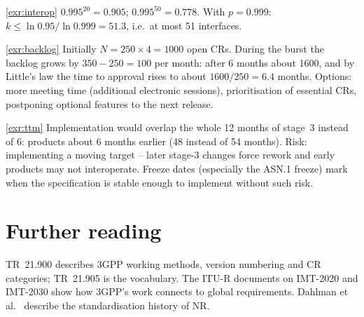 \documentclass[11pt,a4paper]{article}
\begin{document}
\begin{solutionbox}{\ref{exr:interop}}
$0.995^{20} = 0.905$; $0.995^{50} = 0.778$. With $p = 0.999$: $k \le \ln 0.95/\ln 0.999 = 51.3$, i.e.\ at most 51 interfaces.
\end{solutionbox}

\begin{solutionbox}{\ref{exr:backlog}}
Initially $N = 250\times4 = 1000$ open CRs. During the burst the backlog grows by $350 - 250 = 100$ per month: after 6 months
about 1600, and by Little's law the time to approval rises to about $1600/250 = 6.4$ months. Options: more meeting time
(additional electronic sessions), prioritisation of essential CRs, postponing optional features to the next release.
\end{solutionbox}

\begin{solutionbox}{\ref{exr:ttm}}
Implementation would overlap the whole 12 months of stage~3 instead of 6: products about 6 months earlier (48 instead of 54
months). Risk: implementing a moving target -- later stage-3 changes force rework and early products may not interoperate.
Freeze dates (especially the ASN.1 freeze) mark when the specification is stable enough to implement without such risk.
\end{solutionbox}

\section{Further reading}
TR~21.900 \cite{tr21900} describes 3GPP working methods, version numbering and CR categories; TR~21.905 \cite{tr21905} is the
vocabulary. The ITU-R documents on IMT-2020 and IMT-2030 \cite{itu2015m2083,itu2017m2410,itu2023m2160} show how 3GPP's work
connects to global requirements. Dahlman et al.\ \cite{dahlman2020nr} describe the standardisation history of NR.

\printbibliography[heading=subbibliography,title={\ACNstrRefs}]
\end{document}
